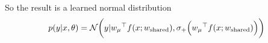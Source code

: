 So the result is a learned normal distribution
\begin{equation}
    p(y|x,\theta) = \mathcal{N}\mleft(y| \transpose{w_\mu} f(x;w_{\text{shared}}), \sigma_{+} \mleft( \transpose{w_\mu} f(x;w_{\text{shared}}) \mright)  \mright)
\end{equation}












































































































